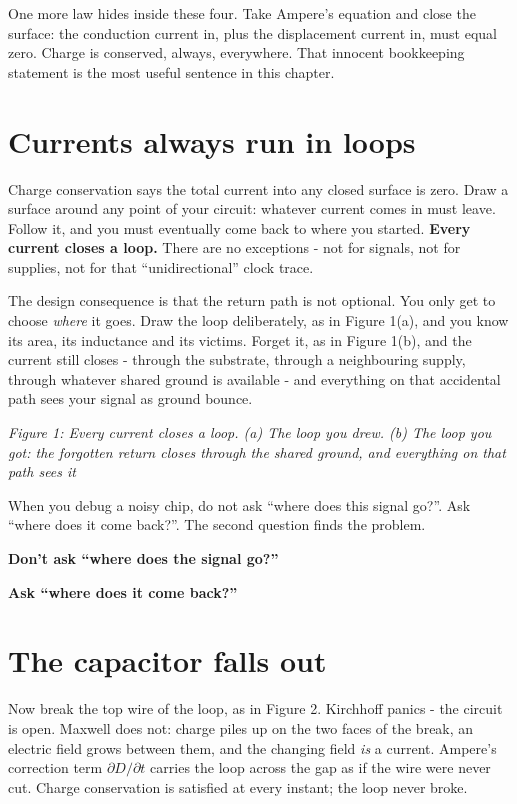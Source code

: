 One more law hides inside these four. Take Ampere's equation and close
the surface: the conduction current in, plus the displacement current
in, must equal zero. Charge is conserved, always, everywhere. That
innocent bookkeeping statement is the most useful sentence in this
chapter.

\section{Currents always run in
loops}\label{currents-always-run-in-loops}

Charge conservation says the total current into any closed surface is
zero. Draw a surface around any point of your circuit: whatever current
comes in must leave. Follow it, and you must eventually come back to
where you started. \textbf{Every current closes a loop.} There are no
exceptions - not for signals, not for supplies, not for that
``unidirectional'' clock trace.

The design consequence is that the return path is not optional. You only
get to choose \emph{where} it goes. Draw the loop deliberately, as in
Figure 1(a), and you know its area, its inductance and its victims.
Forget it, as in Figure 1(b), and the current still closes - through the
substrate, through a neighbouring supply, through whatever shared ground
is available - and everything on that accidental path sees your signal
as ground bounce.


{
\centering
{}
}

\emph{Figure 1: Every current closes a loop. (a) The loop you drew. (b)
The loop you got: the forgotten return closes through the shared ground,
and everything on that path sees it}

When you debug a noisy chip, do not ask ``where does this signal go?''.
Ask ``where does it come back?''. The second question finds the problem.

\textbf{Don't ask ``where does the signal go?''}

\textbf{Ask ``where does it come back?''}

\section{The capacitor falls out}\label{the-capacitor-falls-out}

Now break the top wire of the loop, as in Figure 2. Kirchhoff panics -
the circuit is open. Maxwell does not: charge piles up on the two faces
of the break, an electric field grows between them, and the changing
field \emph{is} a current. Ampere's correction term
\(\partial D/\partial t\) carries the loop across the gap as if the wire
were never cut. Charge conservation is satisfied at every instant; the
loop never broke.

